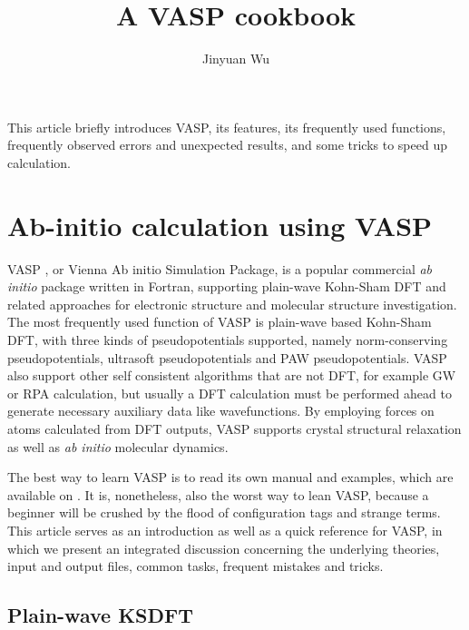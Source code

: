 \documentclass[hyperref, a4paper]{article}
\title{A VASP cookbook}
\author{Jinyuan Wu}
\begin{document}
\maketitle

This article briefly introduces VASP, its features, its frequently used functions, frequently observed errors and unexpected results, and some tricks to speed up calculation.

\section{Ab-initio calculation using VASP}

VASP \cite{vamp-article,vasp-article}, or Vienna Ab initio Simulation Package, is a popular commercial \emph{ab initio} package written in Fortran, supporting plain-wave Kohn-Sham DFT and related approaches for electronic structure and molecular structure investigation.
The most frequently used function of VASP is plain-wave based Kohn-Sham DFT, with three kinds of pseudopotentials supported,
namely norm-conserving pseudopotentials, ultrasoft pseudopotentials and PAW pseudopotentials.
VASP also support other self consistent algorithms that are not DFT, for example GW or RPA calculation, but usually a DFT calculation must be performed ahead to generate necessary auxiliary data like wavefunctions.
By employing forces on atoms calculated from DFT outputs, VASP supports crystal structural relaxation as well as \emph{ab initio} molecular dynamics.

The best way to learn VASP is to read its own manual and examples, which are available on \cite{vasp-manual}.
It is, nonetheless, also the worst way to lean VASP, because a beginner will be crushed by the flood of configuration tags and strange terms.
This article serves as an introduction as well as a quick reference for VASP, in which we present an integrated discussion concerning the underlying theories, input and output files, common tasks, frequent mistakes and tricks.

\subsection{Plain-wave KSDFT}
\end{document}

